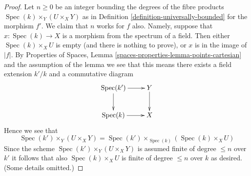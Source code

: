\documentclass{stacks-project}
\theoremstyle{plain}
\theoremstyle{definition}
\theoremstyle{remark}
\numberwithin{equation}{subsection}
\def\Spec{\mathop{\mathrm{Spec}}}
\begin{document}
\begin{proof}
Let $n \geq 0$ be an integer bounding the degrees of the fibre
products $\Spec(k) \times_Y (U \times_X Y)$ as in
Definition \ref{definition-universally-bounded} for the morphism $f'$.
We claim that $n$ works for $f$ also. Namely, suppose that
$x : \Spec(k) \to X$ is a morphism from the spectrum of
a field. Then either $\Spec(k) \times_X U$ is empty (and there
is nothing to prove), or $x$ is in the image of $|f|$. By
Properties of Spaces,
Lemma \ref{spaces-properties-lemma-points-cartesian}
and the assumption of the lemma we see
that this means there exists a field extension $k'/k$ and a
commutative diagram
$$
\xymatrix{
\Spec(k') \ar[r] \ar[d] & Y \ar[d] \\
\Spec(k) \ar[r] & X
}
$$
Hence we see that
$$
\Spec(k') \times_Y (U \times_X Y) =
\Spec(k') \times_{\Spec(k)} (\Spec(k) \times_X U)
$$
Since the scheme $\Spec(k') \times_Y (U \times_X Y)$ is assumed finite
of degree $\leq n$ over $k'$ it follows that also $\Spec(k) \times_X U$
is finite of degree $\leq n$ over $k$ as desired. (Some details omitted.)
\end{proof}
\end{document}
